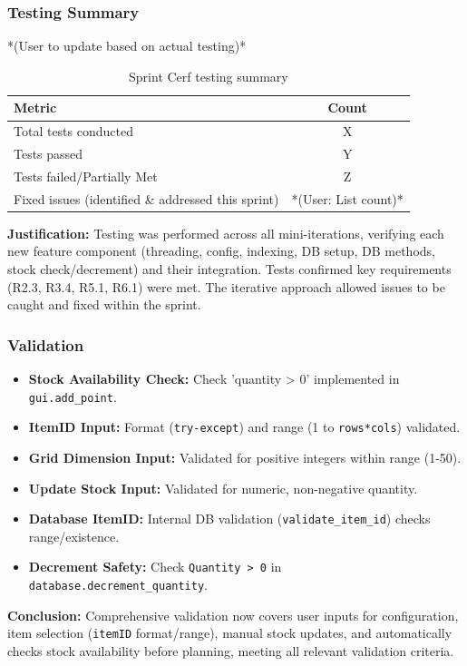 	\subsubsection{Testing Summary}
	*(User to update based on actual testing)*
	\begin{table}[htbp]
		\centering
		\begin{tabular}{|l|c|}
			\hline
			\textbf{Metric} & \textbf{Count} \\
			\hline
			Total tests conducted & X \\ %
			\hline
			Tests passed & Y \\
			\hline
			Tests failed/Partially Met & Z \\
			\hline
			Fixed issues (identified \& addressed this sprint) & *(User: List count)* \\
			\hline
		\end{tabular}
		\caption{Sprint Cerf testing summary}
	\end{table}
	\textbf{Justification:} Testing was performed across all mini-iterations, verifying each new feature component (threading, config, indexing, DB setup, DB methods, stock check/decrement) and their integration. Tests confirmed key requirements (R2.3, R3.4, R5.1, R6.1) were met. The iterative approach allowed issues to be caught and fixed within the sprint.
		
\subsubsection{Validation}
\begin{itemize}
	\item \textbf{Stock Availability Check:} Check 'quantity > 0' implemented in \verb|gui.add_point|.
	\item \textbf{ItemID Input:} Format (\verb|try-except|) and range (1 to \verb|rows*cols|) validated.
	\item \textbf{Grid Dimension Input:} Validated for positive integers within range (1-50).
	\item \textbf{Update Stock Input:} Validated for numeric, non-negative quantity.
	\item \textbf{Database ItemID:} Internal DB validation (\verb|validate_item_id|) checks range/existence.
	\item \textbf{Decrement Safety:} Check \verb|Quantity > 0| in \verb|database.decrement_quantity|.
\end{itemize}
\textbf{Conclusion:} Comprehensive validation now covers user inputs for configuration, item selection (\verb|itemID| format/range), manual stock updates, and automatically checks stock availability before planning, meeting all relevant validation criteria.


